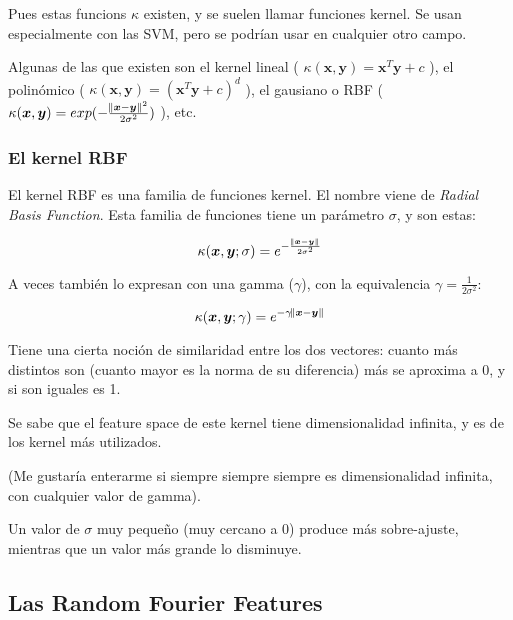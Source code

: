 \documentclass{article}
\newcommand{\vx}{\bm{x}}
\newcommand{\vy}{\bm{y}}
\begin{document}
Pues estas funcions $\kappa$ existen, y se suelen llamar funciones kernel. Se usan
especialmente con las SVM, pero se podrían usar en cualquier otro campo.

Algunas de las que existen son el kernel lineal (
$\kappa(\vx, \vy) = \vx^T\vy + c$
), el polinómico (
$\kappa(\vx, \vy) = (\vx^T\vy + c)^d$
), el gausiano o RBF (
$\kappa(\vx, \vy) = exp(-\frac{\norm{\vx - \vy}^2}{2\sigma^2})$
), etc.

\subsubsection{El kernel RBF}

El kernel RBF es una familia de funciones kernel. El nombre viene de
\textit{Radial Basis Function}. Esta familia de funciones tiene un parámetro
$\sigma$, y son estas:

\begin{equation}
 \kappa({\vx, \vy}; \sigma) = e^{-\frac{\norm{\vx - \vy}}{2\sigma^2}}
\end{equation}

A veces también lo expresan con una gamma ($\gamma$), con la equivalencia
$\gamma = \frac{1}{2\sigma^2}$:

\begin{equation}
 \kappa({\vx, \vy}; \gamma) = e^{-\gamma\norm{\vx - \vy}}
\end{equation}

Tiene una cierta noción de similaridad entre los dos vectores: cuanto más
distintos son (cuanto mayor es la norma de su diferencia) más se aproxima a 0,
y si son iguales es 1.


Se sabe que el feature space de este kernel tiene dimensionalidad infinita, y
es de los kernel más utilizados.

(Me gustaría enterarme si siempre siempre siempre es dimensionalidad infinita,
con cualquier valor de gamma).

Un valor de $\sigma$ muy pequeño (muy cercano a 0) produce más sobre-ajuste,
mientras que un valor más grande lo disminuye.


\subsection{Las Random Fourier Features}
\end{document}
